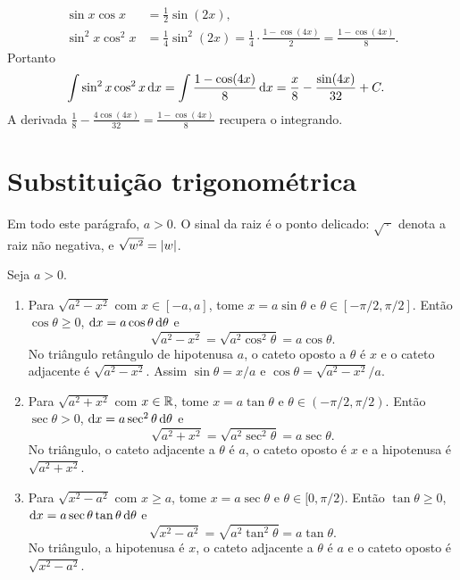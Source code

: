 \documentclass[11pt,a4paper]{article}
\begin{document}
\begin{exemplo}
\begin{align*}
\sin x\cos x&=\frac12\sin(2x),\\
\sin^{2}x\cos^{2}x
&=\frac14\sin^{2}(2x)
=\frac14\cdot\frac{1-\cos(4x)}{2}
=\frac{1-\cos(4x)}{8}.
\end{align*}
Portanto
\begin{align*}
\int\sin^{2}x\cos^{2}x\,\mathrm{d} x
&=\int\frac{1-\cos(4x)}{8}\,\mathrm{d} x
=\frac{x}{8}-\frac{\sin(4x)}{32}+C.
\end{align*}
A derivada \(\frac18-\frac{4\cos(4x)}{32}=\frac{1-\cos(4x)}{8}\) recupera o integrando.
\end{exemplo}

\section{Substituição trigonométrica}

Em todo este parágrafo, \(a>0\). O sinal da raiz é o ponto delicado: \(\sqrt{\,\cdot\,}\) denota a raiz não negativa, e \(\sqrt{w^{2}}=\left\lvert w \right\rvert\).

\begin{teorema}
Seja \(a>0\).
\begin{enumerate}
\item Para \(\sqrt{a^{2}-x^{2}}\) com \(x\in[-a,a]\), tome \(x=a\sin\theta\) e \(\theta\in[-\pi/2,\pi/2]\). Então \(\cos\theta\ge 0\), \(\mathrm{d} x=a\cos\theta\,\mathrm{d}\theta\) e
\[
\sqrt{a^{2}-x^{2}}=\sqrt{a^{2}\cos^{2}\theta}=a\cos\theta.
\]
No triângulo retângulo de hipotenusa \(a\), o cateto oposto a \(\theta\) é \(x\) e o cateto adjacente é \(\sqrt{a^{2}-x^{2}}\). Assim \(\sin\theta=x/a\) e \(\cos\theta=\sqrt{a^{2}-x^{2}}/a\).
\item Para \(\sqrt{a^{2}+x^{2}}\) com \(x\in\mathbb{R}\), tome \(x=a\tan\theta\) e \(\theta\in(-\pi/2,\pi/2)\). Então \(\sec\theta>0\), \(\mathrm{d} x=a\sec^{2}\theta\,\mathrm{d}\theta\) e
\[
\sqrt{a^{2}+x^{2}}=\sqrt{a^{2}\sec^{2}\theta}=a\sec\theta.
\]
No triângulo, o cateto adjacente a \(\theta\) é \(a\), o cateto oposto é \(x\) e a hipotenusa é \(\sqrt{a^{2}+x^{2}}\).
\item Para \(\sqrt{x^{2}-a^{2}}\) com \(x\ge a\), tome \(x=a\sec\theta\) e \(\theta\in[0,\pi/2)\). Então \(\tan\theta\ge 0\), \(\mathrm{d} x=a\sec\theta\tan\theta\,\mathrm{d}\theta\) e
\[
\sqrt{x^{2}-a^{2}}=\sqrt{a^{2}\tan^{2}\theta}=a\tan\theta.
\]
No triângulo, a hipotenusa é \(x\), o cateto adjacente a \(\theta\) é \(a\) e o cateto oposto é \(\sqrt{x^{2}-a^{2}}\).
\end{enumerate}
\end{teorema}
\end{document}
